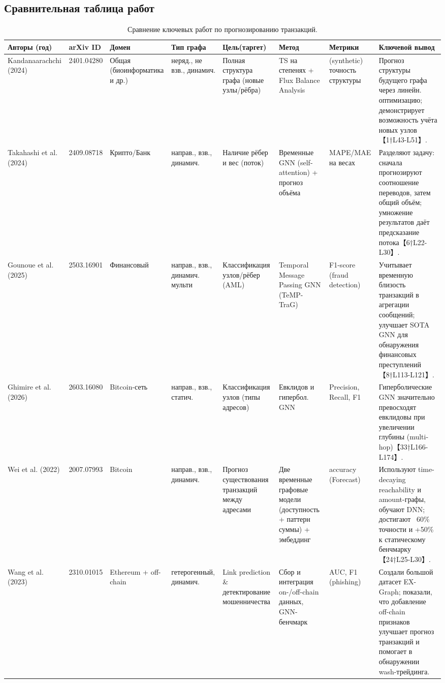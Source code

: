 \subsection{Сравнительная таблица работ}

\begin{table}[ht]
\caption{Сравнение ключевых работ по прогнозированию транзакций.}
\centering
\begin{tabular}{|p{2.3cm}|p{1.3cm}|p{2cm}|p{2cm}|p{2cm}|p{3cm}|p{2cm}|p{3cm}|}
\hline
Авторы (год) & arXiv ID & Домен & Тип графа & Цель(таргет) & Метод & Метрики & Ключевой вывод \\
\hline
Kandanaarachchi (2024) & 2401.04280 & Общая (биоинформатика и др.) & неряд., не взв., динамич. & Полная структура графа (новые узлы/рёбра) & TS на степенях + Flux Balance Analysis & (synthetic) точность структуры & Прогноз структуры будущего графа через линейн. оптимизацию; демонстрирует возможность учёта новых узлов【1†L43-L51】. \\
\hline
Takahashi et al. (2024) & 2409.08718 & Крипто/Банк & направ., взв., динамич. & Наличие рёбер и вес (поток) & Временные GNN (self-attention) + прогноз объёма & MAPE/MAE на весах & Разделяют задачу: сначала прогнозируют соотношение переводов, затем общий объём; умножение результатов даёт предсказание потока【6†L22-L30】. \\
\hline
Gounoue et al. (2025) & 2503.16901 & Финансовый & направ., взв., динамич. мульти & Классификация узлов/рёбер (AML) & Temporal Message Passing GNN (TeMP-TraG) & F1-score (fraud detection) & Учитывает временную близость транзакций в агрегации сообщений; улучшает SOTA GNN для обнаружения финансовых преступлений【8†L113-L121】. \\
\hline
Ghimire et al. (2026) & 2603.16080 & Bitcoin-сеть & направ., взв., статич. & Классификация узлов (типы адресов) & Евклидов и гипербол. GNN & Precision, Recall, F1 & Гиперболические GNN значительно превосходят евклидовы при увеличении глубины (multi-hop)【33†L166-L174】. \\
\hline
Wei et al. (2022) & 2007.07993 & Bitcoin & направ., взв., динамич. & Прогноз существования транзакций между адресами & Две временные графовые модели (доступность + паттерн суммы) + эмбеддинг & accuracy (Forecast) & Используют time-decaying reachability и amount-графы, обучают DNN; достигают ~60\% точности и +50\% к статическому бенчмарку【24†L25-L30】. \\
\hline
Wang et al. (2023) & 2310.01015 & Ethereum + off-chain & гетерогенный, динамич. & Link prediction \& детектирование мошенничества & Сбор и интеграция on-/off-chain данных, GNN-бенчмарк & AUC, F1 (phishing) & Создали большой датасет EX-Graph; показали, что добавление off-chain признаков улучшает прогноз транзакций и помогает в обнаружении wash-трейдинга. \\

\end{tabular}
\end{table}
